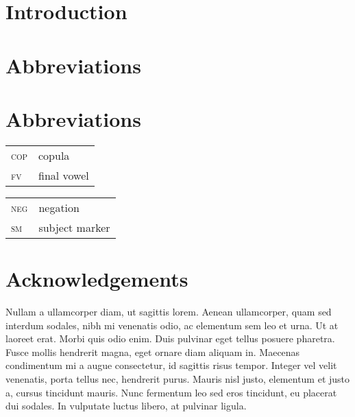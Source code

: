 \documentclass[output=paper]{langsci/langscibook}
\author{Change author in chapters/02.tex}
\begin{document}
\section{Introduction}

 \citep{Chomsky1957}


\section*{Abbreviations}

\section*{Abbreviations}
\begin{tabularx}{.45\textwidth}{lX}
\textsc{cop} & copula\\ 
\textsc{fv} & final vowel\\
\end{tabularx}
\begin{tabularx}{.45\textwidth}{lX}
\textsc{neg} & negation\\ 
\textsc{sm} & subject marker\\
\end{tabularx}

\section*{Acknowledgements}
Nullam a ullamcorper diam, ut sagittis lorem. Aenean ullamcorper, quam sed interdum sodales, nibh mi venenatis odio, ac elementum sem leo et urna. Ut at laoreet erat. Morbi quis odio enim. Duis pulvinar eget tellus posuere pharetra. Fusce mollis hendrerit magna, eget ornare diam aliquam in. Maecenas condimentum mi a augue consectetur, id sagittis risus tempor. Integer vel velit venenatis, porta tellus nec, hendrerit purus. Mauris nisl justo, elementum et justo a, cursus tincidunt mauris. Nunc fermentum leo sed eros tincidunt, eu placerat dui sodales. In vulputate luctus libero, at pulvinar ligula. 

{\sloppy
\printbibliography[heading=subbibliography,notkeyword=this]
}
\end{document}
